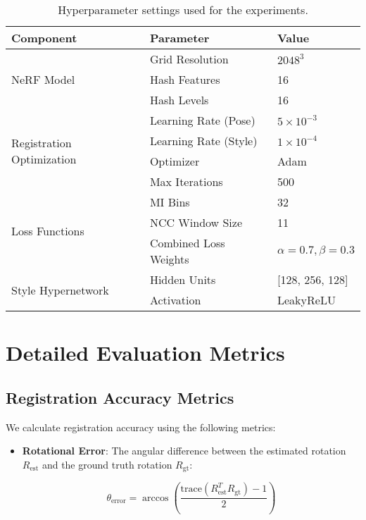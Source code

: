 \begin{appendices}
\begin{table}[htpb]
  \caption[Hyperparameter settings]{Hyperparameter settings used for the experiments.}\label{tab:hyperparameters}
  \centering
  \begin{tabular}{l l l}
    \toprule
      Component & Parameter & Value \\
    \midrule
      \multirow{3}{*}{NeRF Model} & Grid Resolution & $2048^3$ \\
      & Hash Features & 16 \\
      & Hash Levels & 16 \\
    \midrule
      \multirow{4}{*}{Registration Optimization} & Learning Rate (Pose) & $5 \times 10^{-3}$ \\
      & Learning Rate (Style) & $1 \times 10^{-4}$ \\
      & Optimizer & Adam \\
      & Max Iterations & 500 \\
    \midrule
      \multirow{3}{*}{Loss Functions} & MI Bins & 32 \\
      & NCC Window Size & 11 \\
      & Combined Loss Weights & $\alpha=0.7, \beta=0.3$ \\
    \midrule
      \multirow{2}{*}{Style Hypernetwork} & Hidden Units & [128, 256, 128] \\
      & Activation & LeakyReLU \\
    \bottomrule
  \end{tabular}
\end{table}

\section{Detailed Evaluation Metrics}\label{appendix:metrics}

\subsection{Registration Accuracy Metrics}

We calculate registration accuracy using the following metrics:

\begin{itemize}
    \item \textbf{Rotational Error}: The angular difference between the estimated rotation $R_{\text{est}}$ and the ground truth rotation $R_{\text{gt}}$:
    
    \begin{equation}
        \theta_{\text{error}} = \arccos\left(\frac{\text{trace}(R_{\text{est}}^T R_{\text{gt}}) - 1}{2}\right)
    \end{equation}
    

\end{itemize}
\end{appendices}
